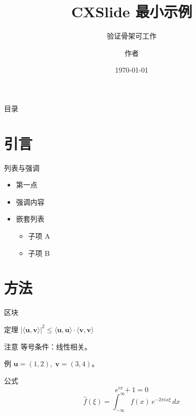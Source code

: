 \documentclass[aspectratio=169, UTF8]{ctexbeamer}
\title{CXSlide 最小示例}
\subtitle{验证骨架可工作}
\author{作者}
\institute{某某大学}
\date{\today}
\begin{document}
\begin{frame}
  \titlepage
\end{frame}

\begin{frame}{目录}
  \tableofcontents
\end{frame}

\section{引言}

\begin{frame}{列表与强调}
  \begin{itemize}
    \item 第一点
    \item \alert{强调}内容
    \item 嵌套列表
      \begin{itemize}
        \item 子项 A
        \item 子项 B
      \end{itemize}
  \end{itemize}
\end{frame}

\section{方法}

\begin{frame}{区块}
  \begin{block}{定理}
    $|\langle \mathbf{u}, \mathbf{v} \rangle|^2
      \leq \langle \mathbf{u}, \mathbf{u} \rangle
           \cdot \langle \mathbf{v}, \mathbf{v} \rangle$
  \end{block}
  \begin{alertblock}{注意}
    等号条件：线性相关。
  \end{alertblock}
  \begin{exampleblock}{例}
    $\mathbf{u}=(1,2),\;\mathbf{v}=(3,4)$。
  \end{exampleblock}
\end{frame}

\begin{frame}{公式}
  \begin{equation}
    e^{i\pi} + 1 = 0
  \end{equation}
  \begin{equation}
    \hat{f}(\xi) = \int_{-\infty}^{\infty}
      f(x)\, e^{-2\pi i x \xi}\, dx
  \end{equation}
\end{frame}
\end{document}
